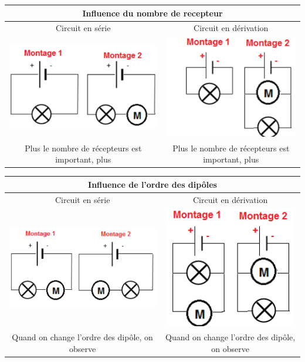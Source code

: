 \documentclass[10pt]{article}
\begin{document}
\renewcommand{\arraystretch}{1.5}
	\centering
	\begin{tabular}{cc} \toprule
		\multicolumn{2}{c}{Influence du nombre de recepteur} \\ \midrule
		Circuit en série & Circuit en dérivation\\ \midrule
		\includegraphics[width=0.23\columnwidth]{nb_dipole1.png} 
								& \includegraphics[width=0.23\columnwidth]{nb_dipole2.png} \\
		\parbox[t]{0.47\textwidth}{
		Plus le nombre de récepteurs
					est important, plus
					} 			& \parbox[t]{0.47\textwidth}{
								Plus le nombre de récepteurs
								est important, plus
								 }
													\\ %
	\end{tabular}
	\begin{tabular}{cc} \toprule
		\multicolumn{2}{c}{Influence de l'ordre des dipôles} \\ \midrule
		Circuit en série & Circuit en dérivation\\ \midrule
		\includegraphics[width=0.3\columnwidth]{ordre_dipole1.png} 
								& \includegraphics[width=0.2\columnwidth]{ordre_dipole2.png} \\
		\parbox[t]{0.47\textwidth}{
			Quand on change l'ordre des dipôle,
			on observe
			\answerbox{1}}
								& \parbox[t]{0.47\textwidth}{
									Quand on change l'ordre des dipôle,
									on observe \answerbox{1}
									} \\
	\end{tabular}
\end{document}
